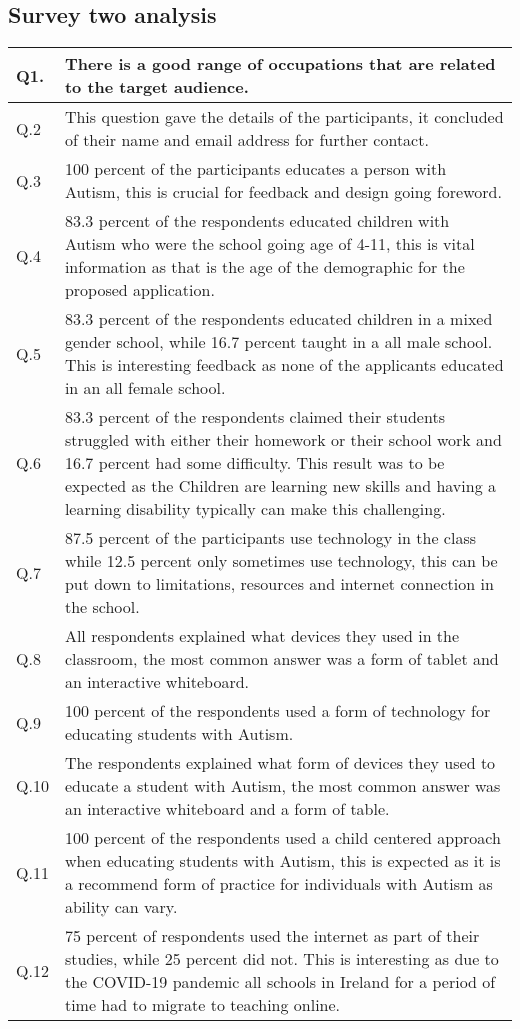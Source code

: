 \subsection{Survey two analysis}

\begin{table} [b]
    \centering
\begin{tabular}{ | m{3em} | m{10cm}| } 
\hline
Q1. & There is a good range of occupations that are related to the target audience. \\ 
\hline
Q.2 & This question gave the details of the participants, it concluded of their name and email address for further contact. \\ 
\hline
Q.3 & 100 percent of the participants educates a person with Autism, this is crucial for feedback and design going foreword.  \\ 
\hline
Q.4 & 83.3 percent of the respondents educated children with Autism who were the school going age of 4-11, this is vital information as that is the age of the demographic for the proposed application.  \\ 
\hline
Q.5 & 83.3 percent of the respondents educated children in a mixed gender school, while 16.7 percent taught in a all male school. This is interesting feedback as none of the applicants educated in an all female school.  \\ 
\hline
Q.6 & 83.3 percent of the respondents claimed their students struggled with either their homework or their school work and 16.7 percent had some difficulty. This result was to be expected as the Children are learning new skills and having a learning disability typically can make this challenging.   \\ 
\hline
Q.7 & 87.5 percent of the participants use technology in the class while 12.5 percent only sometimes use technology, this can be put down to limitations, resources and internet connection in the school. \\ 
\hline
Q.8 & All respondents explained what devices they used in the classroom, the most common answer was a form of tablet and an interactive whiteboard. \\ 
\hline
Q.9 & 100 percent of the respondents used a form of technology for educating students with Autism. \\ 
\hline
Q.10 & The respondents explained what form of devices they used to educate a student with Autism, the most common answer was an interactive whiteboard and a form of table. \\ 
\hline
Q.11 & 100 percent of the respondents used a child centered approach when educating students with Autism, this is expected as it is a recommend form of practice for individuals with Autism as ability can vary. \\ 
\hline
Q.12 & 75 percent of respondents used the internet as part of their studies, while 25 percent did not. This is interesting as due to the COVID-19 pandemic all schools in Ireland for a period of time had to migrate to teaching online. \\ 
\hline


\end{tabular}
\end{table}
